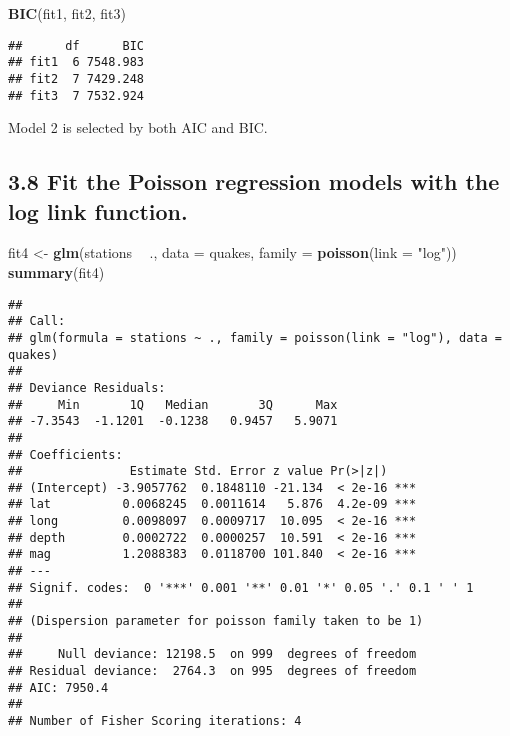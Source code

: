 \documentclass[
]{article}
\newenvironment{Shaded}{\begin{snugshade}}{\end{snugshade}}
\newcommand{\DataTypeTok}[1]{\textcolor[rgb]{0.13,0.29,0.53}{#1}}
\newcommand{\KeywordTok}[1]{\textcolor[rgb]{0.13,0.29,0.53}{\textbf{#1}}}
\newcommand{\NormalTok}[1]{#1}
\newcommand{\OperatorTok}[1]{\textcolor[rgb]{0.81,0.36,0.00}{\textbf{#1}}}
\newcommand{\StringTok}[1]{\textcolor[rgb]{0.31,0.60,0.02}{#1}}
\begin{document}
\begin{Shaded}
\begin{Highlighting}[]
\KeywordTok{BIC}\NormalTok{(fit1, fit2, fit3)}
\end{Highlighting}
\end{Shaded}

\begin{verbatim}
##      df      BIC
## fit1  6 7548.983
## fit2  7 7429.248
## fit3  7 7532.924
\end{verbatim}

Model 2 is selected by both AIC and BIC.

\hypertarget{fit-the-poisson-regression-models-with-the-log-link-function.}{%
\subsection{3.8 Fit the Poisson regression models with the log link
function.}\label{fit-the-poisson-regression-models-with-the-log-link-function.}}

\begin{Shaded}
\begin{Highlighting}[]
\NormalTok{fit4 <-}\StringTok{ }\KeywordTok{glm}\NormalTok{(stations }\OperatorTok{~}\StringTok{ }\NormalTok{., }\DataTypeTok{data =}\NormalTok{ quakes, }\DataTypeTok{family =} \KeywordTok{poisson}\NormalTok{(}\DataTypeTok{link =} \StringTok{"log"}\NormalTok{))}
\KeywordTok{summary}\NormalTok{(fit4)}
\end{Highlighting}
\end{Shaded}

\begin{verbatim}
## 
## Call:
## glm(formula = stations ~ ., family = poisson(link = "log"), data = quakes)
## 
## Deviance Residuals: 
##     Min       1Q   Median       3Q      Max  
## -7.3543  -1.1201  -0.1238   0.9457   5.9071  
## 
## Coefficients:
##               Estimate Std. Error z value Pr(>|z|)    
## (Intercept) -3.9057762  0.1848110 -21.134  < 2e-16 ***
## lat          0.0068245  0.0011614   5.876  4.2e-09 ***
## long         0.0098097  0.0009717  10.095  < 2e-16 ***
## depth        0.0002722  0.0000257  10.591  < 2e-16 ***
## mag          1.2088383  0.0118700 101.840  < 2e-16 ***
## ---
## Signif. codes:  0 '***' 0.001 '**' 0.01 '*' 0.05 '.' 0.1 ' ' 1
## 
## (Dispersion parameter for poisson family taken to be 1)
## 
##     Null deviance: 12198.5  on 999  degrees of freedom
## Residual deviance:  2764.3  on 995  degrees of freedom
## AIC: 7950.4
## 
## Number of Fisher Scoring iterations: 4
\end{verbatim}
\end{document}
